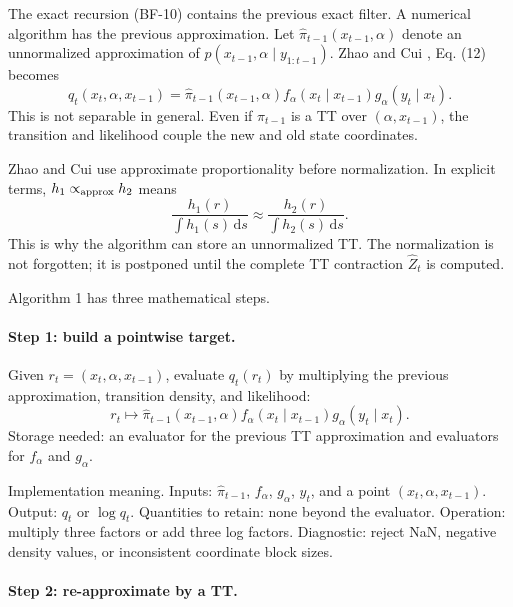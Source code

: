 \documentclass[11pt]{article}
\numberwithin{equation}{section}
\newcommand{\dd}{\,\mathrm d}
\begin{document}
The exact recursion (BF-10) contains the previous exact filter.  A numerical
algorithm has the previous approximation.  Let
\(\widehat\pi_{t-1}(x_{t-1},\alpha)\) denote an unnormalized approximation of
\(p(x_{t-1},\alpha\mid y_{1:t-1})\).  Zhao and Cui \cite{zhao2024ttsequential}, Eq. (12) becomes
\begin{equation}
    q_t(x_t,\alpha,x_{t-1})
    =
    \widehat\pi_{t-1}(x_{t-1},\alpha)
    f_\alpha(x_t\mid x_{t-1})
    g_\alpha(y_t\mid x_t).
    \label{eq:p24-a1-1}
\end{equation}
This is not separable in general.  Even if
\(\widehat\pi_{t-1}\) is a TT over \((\alpha,x_{t-1})\), the transition and
likelihood couple the new and old state coordinates.

Zhao and Cui \cite{zhao2024ttsequential} use approximate proportionality before normalization.  In explicit
terms, \(h_1\propto_{\rm approx} h_2\) means
\begin{equation}
    \frac{h_1(r)}{\int h_1(s)\dd s}
    \approx
    \frac{h_2(r)}{\int h_2(s)\dd s}.
    \label{eq:p24-a1-0}
\end{equation}
This is why the algorithm can store an unnormalized TT.  The normalization is
not forgotten; it is postponed until the complete TT contraction
\(\widehat Z_t\) is computed.

Algorithm 1 has three mathematical steps.

\paragraph{Step 1: build a pointwise target.}
Given \(r_t=(x_t,\alpha,x_{t-1})\), evaluate \(q_t(r_t)\) by multiplying the
previous approximation, transition density, and likelihood:
\[
    r_t\mapsto
    \widehat\pi_{t-1}(x_{t-1},\alpha)
    f_\alpha(x_t\mid x_{t-1})
    g_\alpha(y_t\mid x_t).
\]
Storage needed: an evaluator for the previous TT approximation and evaluators
for \(f_\alpha\) and \(g_\alpha\).

Implementation meaning. Inputs:
\(\widehat\pi_{t-1}\), \(f_\alpha\), \(g_\alpha\), \(y_t\), and a point
\((x_t,\alpha,x_{t-1})\).  Output: \(q_t\) or \(\log q_t\).  Quantities to retain:
none beyond the evaluator.  Operation: multiply three factors or add three log
factors.  Diagnostic: reject NaN, negative density values, or inconsistent
coordinate block sizes.

\paragraph{Step 2: re-approximate by a TT.}
\end{document}
